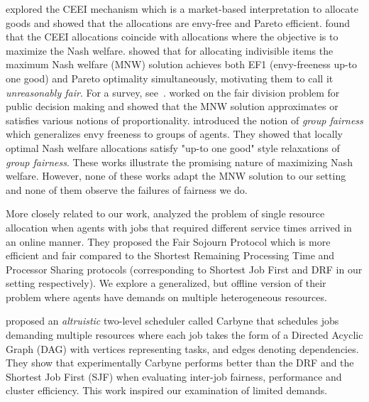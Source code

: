 \documentclass[letterpaper]{article} %
\theoremstyle{definition}
\begin{document}
\citeauthor{VARIAN197463}  explored the CEEI mechanism which is a market-based  interpretation to allocate goods and showed that the allocations are envy-free and Pareto efficient. \citeauthor{arrow2000handbook}  found that the CEEI allocations coincide with allocations where the objective is to maximize the Nash welfare. \citeauthor{Caragiannis2016MaxNashWelfare}  showed that for allocating indivisible items the maximum Nash welfare (MNW) solution achieves both EF1 (envy-freeness up-to one good) and Pareto optimality simultaneously, motivating them to call it \textit{unreasonably fair}. For a survey, see~\citet{moulin2019fair}. \citet{Conitzer2017PublicFairDivision} worked on the fair division problem for public decision making and showed that the MNW solution approximates or satisfies various notions of proportionality. \citeauthor{conitzer2019group}  introduced the notion of \textit{group fairness} which generalizes envy freeness to groups of agents. They showed that locally optimal Nash welfare allocations satisfy "up-to one good" style relaxations of \textit{group fairness}. These works illustrate the promising nature of maximizing Nash welfare. However, none of these works adapt the MNW solution to our setting and none of them observe the failures of fairness we do.

More closely related to our work,
\citeauthor{friedman2003fairness}  analyzed the problem of single resource allocation when agents with jobs that required different service times arrived in an online manner. They proposed the Fair Sojourn Protocol which is more efficient and fair compared to the Shortest Remaining Processing Time and Processor Sharing protocols (corresponding to Shortest Job First and DRF in our setting respectively). We explore a generalized, but offline version of their problem where agents have demands on multiple heterogeneous resources. 

\citeauthor{Grandl2016Carbyne}  proposed an \textit{altruistic} two-level scheduler called Carbyne that schedules jobs demanding multiple resources where each job takes the form of a Directed Acyclic Graph (DAG) with vertices representing tasks, and edges denoting dependencies. They show that experimentally Carbyne performs better than the DRF and the Shortest Job First (SJF) when evaluating inter-job fairness, performance and cluster efficiency. This work inspired our examination of limited demands.
\end{document}
